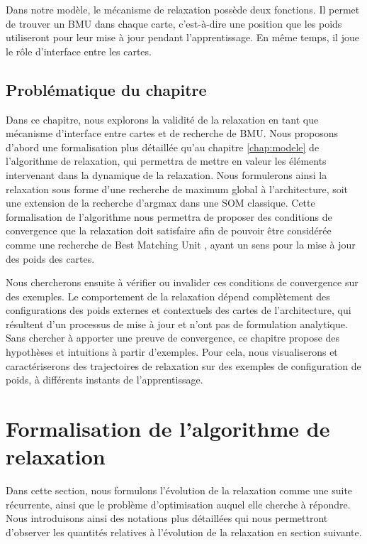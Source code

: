 \documentclass[../main]{subfiles}
\begin{document}
Dans notre modèle, le mécanisme de relaxation possède deux fonctions. Il permet de trouver un BMU dans chaque carte, c'est-à-dire une position que les poids utiliseront pour leur mise à jour pendant l'apprentissage. En même temps, il joue le rôle d'interface entre les cartes.

\subsection{Problématique du chapitre}

Dans ce chapitre, nous explorons la validité de la relaxation en tant que mécanisme d'interface entre cartes et de recherche de BMU.
Nous proposons d'abord une formalisation plus détaillée qu'au chapitre \ref{chap:modele} de l'algorithme de relaxation, qui permettra de mettre en valeur les éléments intervenant dans la dynamique de la relaxation. Nous formulerons ainsi la relaxation sous forme d'une recherche de maximum global à l'architecture, soit une extension de la recherche d'argmax dans une SOM classique.
Cette formalisation de l'algorithme nous permettra de proposer des conditions de convergence que la relaxation doit satisfaire afin de pouvoir être considérée comme une recherche de \og Best Matching Unit \fg{}, ayant un sens pour la mise à jour des poids des cartes.

Nous chercherons ensuite à vérifier ou invalider ces conditions de convergence sur des exemples.
Le comportement de la relaxation dépend complètement des configurations des poids externes et contextuels des cartes de l'architecture, qui résultent d'un processus de mise à jour et n'ont pas de formulation analytique. Sans chercher à apporter une preuve de convergence, ce chapitre propose des hypothèses et intuitions à partir d'exemples. Pour cela, nous visualiserons et caractériserons des trajectoires de relaxation sur des exemples de configuration de poids, à différents instants de l'apprentissage.


\section{Formalisation de l'algorithme de relaxation}

Dans cette section, nous formulons l'évolution de la relaxation comme une suite récurrente, ainsi que le problème d'optimisation auquel elle cherche à répondre.
Nous introduisons ainsi des notations plus détaillées qui nous permettront d'observer les quantités relatives à l'évolution de la relaxation en section suivante.
\end{document}
